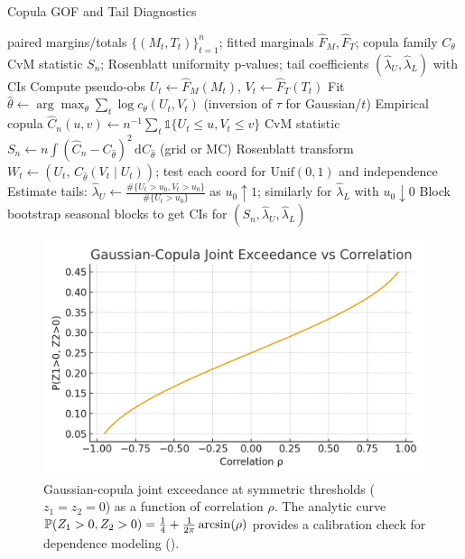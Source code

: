 \begin{algorithm}[t]
  \caption{Copula GOF and Tail Diagnostics}
  \label{alg:copula-gof}
  \begin{algorithmic}[1]
    \Require paired margins/totals $\{(M_t,T_t)\}_{t=1}^n$; fitted marginals $\hat F_M,\hat F_T$; copula family $C_\theta$
    \Ensure CvM statistic $S_n$; Rosenblatt uniformity p‑values; tail coefficients $(\hat\lambda_U,\hat\lambda_L)$ with CIs
    \State Compute pseudo‑obs $U_t\leftarrow\hat F_M(M_t)$, $V_t\leftarrow\hat F_T(T_t)$
    \State Fit $\hat\theta\leftarrow\arg\max_\theta\sum_t \log c_\theta(U_t,V_t)$ (inversion of $\tau$ for Gaussian/$t$)
    \State Empirical copula $\hat C_n(u,v)\leftarrow n^{-1}\sum_t\mathbb{1}\{U_t\le u,V_t\le v\}$
    \State CvM statistic $S_n\leftarrow n\int(\hat C_n-C_{\hat\theta})^2\,\mathrm d C_{\hat\theta}$ (grid or MC)
    \State Rosenblatt transform $W_t\leftarrow(U_t,\, C_{\hat\theta}(V_t\mid U_t))$; test each coord for $\mathrm{Unif}(0,1)$ and independence
    \State Estimate tails: $\hat\lambda_U\leftarrow\frac{\#\{U_t>u_0, V_t>u_0\}}{\#\{U_t>u_0\}}$ as $u_0\uparrow1$; similarly for $\hat\lambda_L$ with $u_0\downarrow0$
    \State Block bootstrap seasonal blocks to get CIs for $(S_n,\hat\lambda_U,\hat\lambda_L)$
  \end{algorithmic}
\end{algorithm}

\begin{figure}[t]
  \centering
  \includegraphics[width=0.9\linewidth]{../figures/joint_exceedance_vs_rho.png}
  \caption[Gaussian copula joint exceedance]{Gaussian-copula joint exceedance at symmetric thresholds ($z_1=z_2=0$) as a function of correlation $\rho$. The analytic curve $\mathbb{P}(Z_1>0,Z_2>0)=\tfrac14+\tfrac{1}{2\pi}\arcsin(\rho)$ provides a calibration check for dependence modeling ().}
  \label{fig:copula-joint}
\end{figure}

